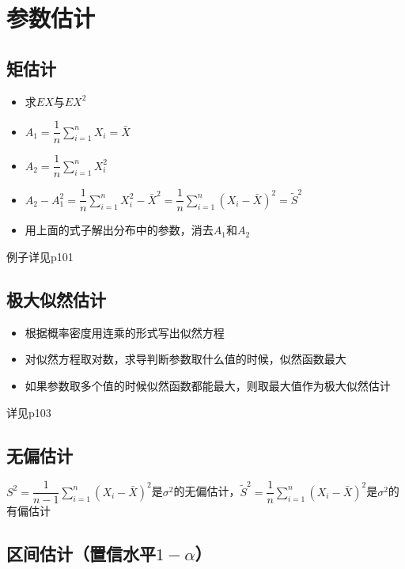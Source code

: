 
\section{参数估计}

\subsection{矩估计}

\begin{itemize}
\item 求$EX$与$EX^{2}$
\item $A_{1} = \dfrac{1}{n} \sum\limits_{i=1}^{n} X_{i} = \bar{X}$
\item $A_{2} = \dfrac{1}{n} \sum\limits_{i=1}^{n} X_{i}^{2}$
\item $A_{2} - A_{1}^{2} = \dfrac{1}{n} \sum\limits_{i=1}^{n} X_{i}^{2} - \bar{X}^{2} = \dfrac{1}{n} \sum\limits_{i=1}^{n} \left( X_{i}-\bar{X} \right)^{2} = \tilde{S}^{2}$
\item 用上面的式子解出分布中的参数，消去$A_{1}$和$A_{2}$
\end{itemize}
例子详见p101

\subsection{极大似然估计}

\begin{itemize}
\item 根据概率密度用连乘的形式写出似然方程
\item 对似然方程取对数，求导判断参数取什么值的时候，似然函数最大
\item 如果参数取多个值的时候似然函数都能最大，则取最大值作为极大似然估计
  
\end{itemize}
详见p103

\subsection{无偏估计}

$S^{2}=\dfrac{1}{n-1} \sum\limits_{i=1}^{n} \left( X_{i} - \bar{X} \right)^{2}$是$\sigma^{2}$的无偏估计，$\tilde{S}^{2}=\dfrac{1}{n} \sum\limits_{i=1}^{n} \left( X_{i} - \bar{X} \right)^{2}$是$\sigma^{2}$的有偏估计

\subsection{区间估计（置信水平$1-\alpha$）}

